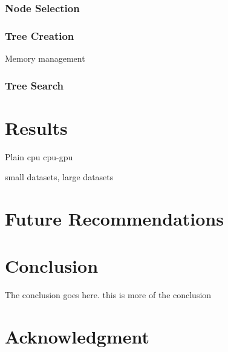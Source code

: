 \documentclass[10pt, conference, compsocconf]{IEEEtran}
\begin{document}
\subsubsection{Node Selection}

\subsubsection{Tree Creation}
Memory management

\subsubsection{Tree Search}

\section{Results}
Plain cpu
cpu-gpu

small datasets, large datasets

\section{Future Recommendations}

\section{Conclusion} 
The conclusion goes here. this is more of the conclusion 
 
 
\section*{Acknowledgment} 

  
  {}


% 
% 
 
\end{document}
